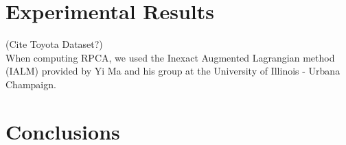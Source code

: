 \documentclass{article}
\begin{document}
\section{Experimental Results}



(Cite Toyota Dataset?)\\

When computing RPCA, we used the Inexact Augmented Lagrangian method (IALM) \cite{alm} provided by Yi Ma and his group at the University of Illinois - Urbana Champaign.

\section{Conclusions}





\end{document}
